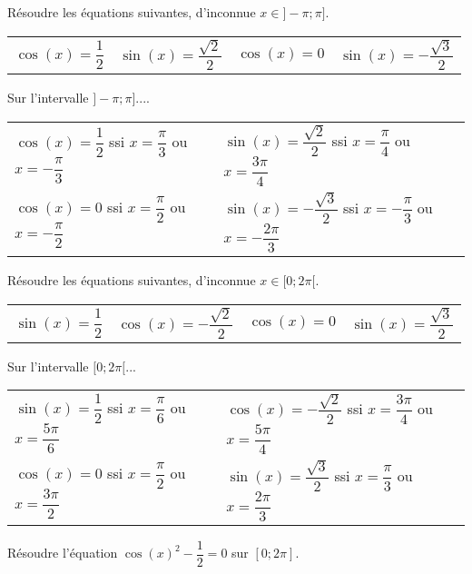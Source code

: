 \documentclass[11pt,fleqn, openany]{book} %
\begin{document}
\begin{exercise}[topic=trig01]Résoudre les équations suivantes, d'inconnue $x\in]-\pi;\pi]$.

\begin{tabularx}{\linewidth}{XXXX}
$\cos (x)=\dfrac{1}{2}$ & $\sin (x) = \dfrac{\sqrt{2}}{2}$ & $\cos (x)=0$ & $\sin (x)=-\dfrac{\sqrt{3}}{2}$
\end{tabularx}\end{exercise}

\begin{solution}Sur l'intervalle $]-\pi;\pi]$....

\begin{tabularx}{\linewidth}{XX}
$\cos (x)=\dfrac{1}{2}$ ssi $x=\dfrac{\pi}{3}$ ou $x=-\dfrac{\pi}{3}$ & $\sin (x) = \dfrac{\sqrt{2}}{2}$ ssi $x=\dfrac{\pi}{4}$ ou $x=\dfrac{3\pi}{4}$ \\ $\cos (x)=0$ ssi $x=\dfrac{\pi}{2}$ ou $x=-\dfrac{\pi}{2}$& $\sin (x)=-\dfrac{\sqrt{3}}{2}$ ssi $x=-\dfrac{\pi}{3}$ ou $x=-\dfrac{2\pi}{3}$
\end{tabularx}\end{solution}



\begin{exercise}[topic=trig01] Résoudre les équations suivantes, d'inconnue $x\in[0;2\pi[$.

\begin{tabularx}{\linewidth}{XXXX}
$\sin (x)=\dfrac{1}{2}$ & $\cos (x) = -\dfrac{\sqrt{2}}{2}$ & $\cos (x)=0$ & $\sin (x)=\dfrac{\sqrt{3}}{2}$
\end{tabularx}\end{exercise}

\begin{solution}Sur l'intervalle $[0;2\pi[$...

\begin{tabularx}{\linewidth}{XX}
$\sin (x)=\dfrac{1}{2}$ ssi $x=\dfrac{\pi}{6}$ ou $x=\dfrac{5\pi}{6}$ & $\cos (x) = -\dfrac{\sqrt{2}}{2}$ ssi $x=\dfrac{3\pi}{4}$ ou $x=\dfrac{5\pi}{4}$\\ $\cos (x)=0$ ssi $x=\dfrac{\pi}{2}$ ou $x=\dfrac{3\pi}{2}$ & $\sin (x)=\dfrac{\sqrt{3}}{2}$ ssi $x=\dfrac{\pi}{3}$ ou $x=\dfrac{2\pi}{3}$
\end{tabularx}\end{solution}




\begin{exercise}[topic=trig01]Résoudre l'équation $\cos(x)^2-\dfrac{1}{2}=0$ sur $[0;2\pi]$.\newpage \end{exercise}
\end{document}
